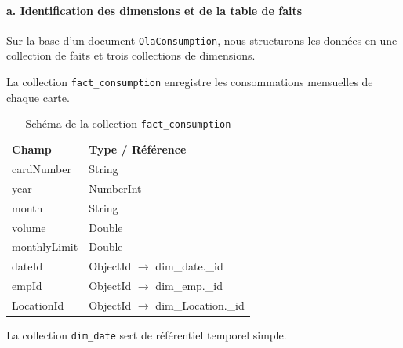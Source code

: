 \documentclass[a4paper,11pt]{report}
\begin{document}
\paragraph{a. Identification des dimensions et de la table de faits\\}  
Sur la base d’un document \texttt{OlaConsumption}, nous structurons les données en une collection de faits et trois collections de dimensions.  
\newpage
\medskip

La collection \texttt{fact\_consumption} enregistre les consommations mensuelles de chaque carte.
\begin{table}[h!]
  \centering
  \renewcommand{\arraystretch}{1.2}
  \begin{tabular}{|l|l|}
    \hline
    \rowcolor{gray!20}
    \multicolumn{2}{|c|}{\textbf{Collection : fact\_consumption}}         \\ \hline
    \textbf{Champ}         & \textbf{Type / Référence}                                \\ \hline
    cardNumber             & String                                                     \\ \hline
    year                   & NumberInt                                                   \\ \hline
    month                  & String                                                      \\ \hline
    volume                 & Double                                                      \\ \hline
    monthlyLimit           & Double                                                      \\ \hline
    dateId                 & ObjectId \(\rightarrow\) dim\_date.\_id                      \\ \hline
    empId                  & ObjectId \(\rightarrow\) dim\_emp.\_id                       \\ \hline
    LocationId                 & ObjectId \(\rightarrow\) dim\_Location.\_id                      \\ \hline
  \end{tabular}
  \caption{Schéma de la collection \texttt{fact\_consumption}}
\end{table}

\vspace{1em}
La collection \texttt{dim\_date} sert de référentiel temporel simple.
\end{document}
